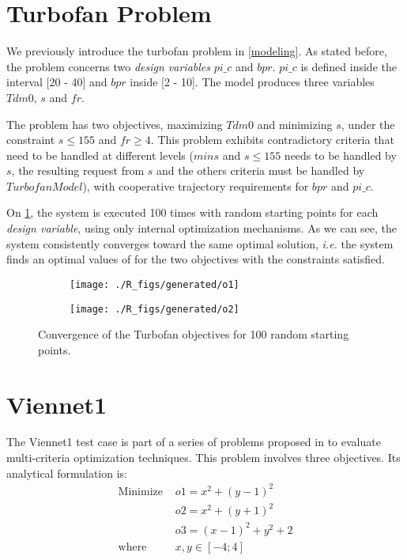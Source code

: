 \section{Turbofan Problem}

We previously introduce the turbofan problem in \ref{modeling}. As stated before, the problem concerns two \emph{design variables} $pi\_c$ and $bpr$. $pi\_c$ is defined inside the interval [20 - 40] and $bpr$ inside [2 - 10]. The model produces three variables $Tdm0$, $s$ and $fr$.

The problem has two objectives, maximizing $Tdm0$ and minimizing $s$, under the constraint \(s \leq 155\) and \(fr \geq 4\).
This problem exhibits contradictory criteria that need to be handled at different levels ($min s$ and $s \leq 155$ needs to be handled by $s$, the resulting request from $s$ and the others criteria must be handled by $Turbofan Model$), with cooperative trajectory requirements for $bpr$ and $pi\_c$.

On \figurename{} \ref{snecma_res}, the system is executed 100 times with random starting points for each \emph{design variable}, using only internal optimization mechanisms. As we can see, the system consistently converges toward the same optimal solution, \emph{i.e.} the system finds an optimal values of for the two objectives with the constraints satisfied.

\begin{figure}[h]
	\begin{subfigure}[b]{0.4\textwidth}
		\centering
		\texttt{[image: ./R\_figs/generated/o1]}	
	\end{subfigure}
	\hfill%
	\begin{subfigure}[b]{0.4\textwidth}
		\centering
		\texttt{[image: ./R\_figs/generated/o2]}	
	\end{subfigure}
	\caption{Convergence of the Turbofan objectives for 100 random starting points.}
	\label{snecma_res}
\end{figure}

\section{Viennet1}

The Viennet1 test case is part of a series of problems proposed in \cite{viennet1996multicriteria} to evaluate multi-criteria optimization techniques. This problem involves three objectives. Its analytical formulation is:
\begin{align*}
\text{Minimize } 	&o1 = x^2 + (y-1)^2 \\
								&o2 = x^2 + (y+1)^2 \\
								&o3 = (x-1)^2 + y^2 +2\\
\text{where } 		&x, y \in [-4;4]						
\end{align*}				

